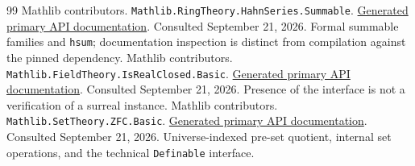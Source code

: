 \documentclass[11pt,letterpaper]{article}
\numberwithin{equation}{section}
\theoremstyle{definition}
\theoremstyle{remark}
\begin{document}
\begin{thebibliography}{99}
Mathlib contributors. \texttt{Mathlib.RingTheory.HahnSeries.Summable}.
\href{https://leanprover-community.github.io/mathlib4_docs/Mathlib/RingTheory/HahnSeries/Summable.html}{Generated primary API documentation}. Consulted September 21, 2026. Formal summable families and \texttt{hsum}; documentation inspection is distinct from compilation against the pinned dependency.
Mathlib contributors. \texttt{Mathlib.FieldTheory.IsRealClosed.Basic}.
\href{https://leanprover-community.github.io/mathlib4_docs/Mathlib/FieldTheory/IsRealClosed/Basic.html}{Generated primary API documentation}. Consulted September 21, 2026. Presence of the interface is not a verification of a surreal instance.
Mathlib contributors. \texttt{Mathlib.SetTheory.ZFC.Basic}.
\href{https://leanprover-community.github.io/mathlib4_docs/Mathlib/SetTheory/ZFC/Basic.html}{Generated primary API documentation}. Consulted September 21, 2026. Universe-indexed pre-set quotient, internal set operations, and the technical \texttt{Definable} interface.
\end{thebibliography}
\endgroup
\end{document}
